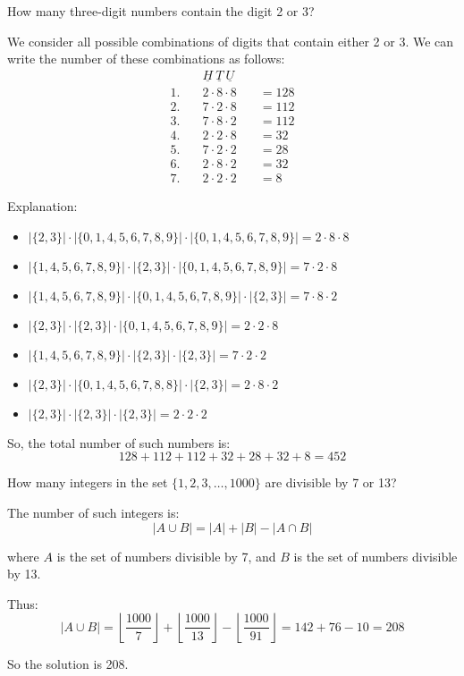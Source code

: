 \documentclass[a4paper,10pt]{article}
\begin{document}
\begin{problem}
	How many three-digit numbers contain the digit 2 or 3?

	We consider all possible combinations of digits that contain either 2 or 3. We can write the number of these combinations as follows:
	\[
		\begin{aligned}
			& \underline{H}\ \underline{T}\ \underline{U} & \\
			1. \quad & 2 \cdot 8 \cdot 8 & \quad = 128 \\
			2. \quad & 7 \cdot 2 \cdot 8 & \quad = 112 \\
			3. \quad & 7 \cdot 8 \cdot 2 & \quad = 112 \\
			4. \quad & 2 \cdot 2 \cdot 8 & \quad = 32 \\
			5. \quad & 7 \cdot 2 \cdot 2 & \quad = 28 \\
			6. \quad & 2 \cdot 8 \cdot 2 & \quad = 32 \\
			7. \quad & 2 \cdot 2 \cdot 2 & \quad = 8
		\end{aligned}
	\]

	Explanation:
	\begin{itemize}
		\item $|\{ 2,3 \}| \cdot |\{ 0,1,4,5,6,7,8,9 \}| \cdot |\{ 0,1,4,5,6,7,8,9 \}| = 2 \cdot 8 \cdot 8$
		\item $|\{ 1,4,5,6,7,8,9 \}| \cdot |\{ 2,3 \}| \cdot |\{ 0,1,4,5,6,7,8,9 \}| = 7 \cdot 2 \cdot 8$
		\item $|\{ 1,4,5,6,7,8,9 \}| \cdot |\{ 0,1,4,5,6,7,8,9 \}| \cdot |\{ 2,3 \}| = 7 \cdot 8 \cdot 2$
		\item $|\{ 2,3 \}| \cdot |\{ 2,3 \}| \cdot |\{ 0,1,4,5,6,7,8,9 \}| = 2 \cdot 2 \cdot 8$
		\item $|\{ 1,4,5,6,7,8,9 \}| \cdot |\{ 2,3 \}| \cdot |\{ 2,3 \}| = 7 \cdot 2 \cdot 2$
		\item $|\{ 2,3 \}| \cdot |\{ 0,1,4,5,6,7,8,8 \}| \cdot |\{ 2,3 \}| = 2 \cdot 8 \cdot 2$
		\item $|\{ 2,3 \}| \cdot |\{ 2,3 \}| \cdot |\{ 2,3 \}| = 2 \cdot 2 \cdot 2$
	\end{itemize}

	So, the total number of such numbers is:
	\[
		128 + 112 + 112 + 32 + 28 + 32 + 8 = 452
	\]
\end{problem}

\begin{problem}
	How many integers in the set $\{ 1,2,3,\dots,1000 \}$ are divisible by 7 or 13?

	The number of such integers is:
	\[
		|A \cup B| = |A| + |B| - |A \cap B|
	\]

	where $A$ is the set of numbers divisible by 7, and $B$ is the set of numbers divisible by 13.

	Thus:
	\[
		|A \cup B| = \left\lfloor  \frac{1000}{7}  \right\rfloor + \left\lfloor  \frac{1000}{13}  \right\rfloor - \left\lfloor  \frac{1000}{91}  \right\rfloor = 142 + 76 - 10 = 208 
	\]

	So the solution is 208.
\end{problem}
\end{document}
